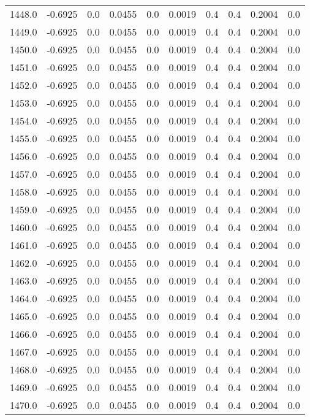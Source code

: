 \begin{longtable}{lrrrrrrrrr}
1448.0 & -0.6925 & 0.0 & 0.0455 & 0.0 & 0.0019 & 0.4 & 0.4 & 0.2004 & 0.0 \\
1449.0 & -0.6925 & 0.0 & 0.0455 & 0.0 & 0.0019 & 0.4 & 0.4 & 0.2004 & 0.0 \\
1450.0 & -0.6925 & 0.0 & 0.0455 & 0.0 & 0.0019 & 0.4 & 0.4 & 0.2004 & 0.0 \\
1451.0 & -0.6925 & 0.0 & 0.0455 & 0.0 & 0.0019 & 0.4 & 0.4 & 0.2004 & 0.0 \\
1452.0 & -0.6925 & 0.0 & 0.0455 & 0.0 & 0.0019 & 0.4 & 0.4 & 0.2004 & 0.0 \\
1453.0 & -0.6925 & 0.0 & 0.0455 & 0.0 & 0.0019 & 0.4 & 0.4 & 0.2004 & 0.0 \\
1454.0 & -0.6925 & 0.0 & 0.0455 & 0.0 & 0.0019 & 0.4 & 0.4 & 0.2004 & 0.0 \\
1455.0 & -0.6925 & 0.0 & 0.0455 & 0.0 & 0.0019 & 0.4 & 0.4 & 0.2004 & 0.0 \\
1456.0 & -0.6925 & 0.0 & 0.0455 & 0.0 & 0.0019 & 0.4 & 0.4 & 0.2004 & 0.0 \\
1457.0 & -0.6925 & 0.0 & 0.0455 & 0.0 & 0.0019 & 0.4 & 0.4 & 0.2004 & 0.0 \\
1458.0 & -0.6925 & 0.0 & 0.0455 & 0.0 & 0.0019 & 0.4 & 0.4 & 0.2004 & 0.0 \\
1459.0 & -0.6925 & 0.0 & 0.0455 & 0.0 & 0.0019 & 0.4 & 0.4 & 0.2004 & 0.0 \\
1460.0 & -0.6925 & 0.0 & 0.0455 & 0.0 & 0.0019 & 0.4 & 0.4 & 0.2004 & 0.0 \\
1461.0 & -0.6925 & 0.0 & 0.0455 & 0.0 & 0.0019 & 0.4 & 0.4 & 0.2004 & 0.0 \\
1462.0 & -0.6925 & 0.0 & 0.0455 & 0.0 & 0.0019 & 0.4 & 0.4 & 0.2004 & 0.0 \\
1463.0 & -0.6925 & 0.0 & 0.0455 & 0.0 & 0.0019 & 0.4 & 0.4 & 0.2004 & 0.0 \\
1464.0 & -0.6925 & 0.0 & 0.0455 & 0.0 & 0.0019 & 0.4 & 0.4 & 0.2004 & 0.0 \\
1465.0 & -0.6925 & 0.0 & 0.0455 & 0.0 & 0.0019 & 0.4 & 0.4 & 0.2004 & 0.0 \\
1466.0 & -0.6925 & 0.0 & 0.0455 & 0.0 & 0.0019 & 0.4 & 0.4 & 0.2004 & 0.0 \\
1467.0 & -0.6925 & 0.0 & 0.0455 & 0.0 & 0.0019 & 0.4 & 0.4 & 0.2004 & 0.0 \\
1468.0 & -0.6925 & 0.0 & 0.0455 & 0.0 & 0.0019 & 0.4 & 0.4 & 0.2004 & 0.0 \\
1469.0 & -0.6925 & 0.0 & 0.0455 & 0.0 & 0.0019 & 0.4 & 0.4 & 0.2004 & 0.0 \\
1470.0 & -0.6925 & 0.0 & 0.0455 & 0.0 & 0.0019 & 0.4 & 0.4 & 0.2004 & 0.0 \\

\end{longtable}
